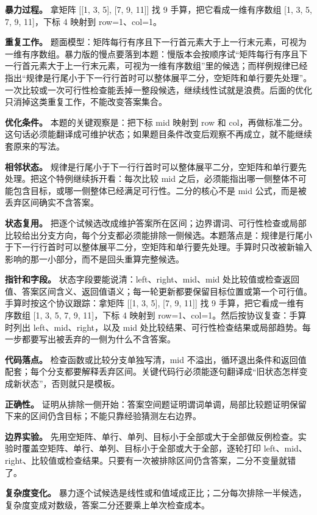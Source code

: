 \textbf{暴力过程。} 拿矩阵 [[1, 3, 5], [7, 9, 11]] 找 9 手算，把它看成一维有序数组 [1, 3, 5, 7, 9, 11]，下标 4 映射到 row=1、col=1。

\textbf{重复工作。} 题面模型：矩阵每行有序且下一行首元素大于上一行末元素，可视为一维有序数组。暴力版的慢点要落到本题：慢版本会按顺序试“矩阵每行有序且下一行首元素大于上一行末元素，可视为一维有序数组”里的候选；而样例规律已经指出“规律是行尾小于下一行行首时可以整体展平二分，空矩阵和单行要先处理”。一次比较或一次可行性检查能丢掉一整段候选，继续线性试就是浪费。后面的优化只消掉这类重复工作，不能改变答案集合。

\textbf{优化条件。} 本题的关键观察是：把下标 mid 映射到 row 和 col，再做标准二分。这句话必须能翻译成可维护状态；如果题目条件改变后观察不再成立，就不能继续套原来的写法。

\textbf{相邻状态。} 规律是行尾小于下一行行首时可以整体展平二分，空矩阵和单行要先处理。把这个特例继续拆开看：每次比较 mid 之后，必须能指出哪一侧整体不可能包含目标，或哪一侧整体已经满足可行性。二分的核心不是 mid 公式，而是被丢弃区间确实不含答案。

\textbf{状态复用。} 把逐个试候选改成维护答案所在区间；边界谓词、可行性检查或局部比较给出分支方向，每个分支都必须能排除一侧候选。本题落点是：规律是行尾小于下一行行首时可以整体展平二分，空矩阵和单行要先处理。手算时只改被新输入影响的那一小部分，而不是回头重算完整候选。

\textbf{指针和字段。} 状态字段要能说清：left、right、mid、mid 处比较值或检查返回值、答案区间含义、返回值语义；每一轮更新都要保留目标位置或第一个可行值。手算时按这个协议跟踪：拿矩阵 [[1, 3, 5], [7, 9, 11]] 找 9 手算，把它看成一维有序数组 [1, 3, 5, 7, 9, 11]，下标 4 映射到 row=1、col=1。然后按协议复查：手算时列出 left、mid、right，以及 mid 处比较结果、可行性检查结果或局部趋势。每一步都要写出被丢弃的一侧为什么不含答案。

\textbf{代码落点。} 检查函数或比较分支单独写清，mid 不溢出，循环退出条件和返回值配套；每个分支都要解释丢弃区间。关键代码行必须能逐句翻译成“旧状态怎样变成新状态”，否则就只是模板。

\textbf{正确性。} 证明从排除一侧开始：答案空间题证明谓词单调，局部比较题证明保留下来的区间仍含目标；不能只靠经验猜测左右边界。

\textbf{边界实验。} 先用空矩阵、单行、单列、目标小于全部或大于全部做反例检查。实验时覆盖空矩阵、单行、单列、目标小于全部或大于全部，逐轮打印 left、mid、right、比较值或检查结果。只要有一次被排除区间仍含答案，二分不变量就错了。

\textbf{复杂度变化。} 暴力逐个试候选是线性或和值域成正比；二分每次排除一半候选，复杂度变成对数级，答案二分还要乘上单次检查成本。

